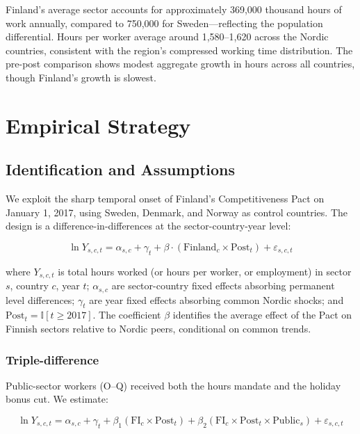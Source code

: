 \documentclass[12pt]{article}
\newcommand{\ind}{\mathbb{I}}
\begin{document}
Finland's average sector accounts for approximately 369,000 thousand hours of work annually, compared to 750,000 for Sweden---reflecting the population differential. Hours per worker average around 1,580--1,620 across the Nordic countries, consistent with the region's compressed working time distribution. The pre-post comparison shows modest aggregate growth in hours across all countries, though Finland's growth is slowest.


\section{Empirical Strategy}

\subsection{Identification and Assumptions}

We exploit the sharp temporal onset of Finland's Competitiveness Pact on January 1, 2017, using Sweden, Denmark, and Norway as control countries. The design is a difference-in-differences at the sector-country-year level:

\begin{equation}
\ln Y_{s,c,t} = \alpha_{s,c} + \gamma_t + \beta \cdot (\text{Finland}_c \times \text{Post}_t) + \varepsilon_{s,c,t}
\label{eq:did}
\end{equation}

where $Y_{s,c,t}$ is total hours worked (or hours per worker, or employment) in sector $s$, country $c$, year $t$; $\alpha_{s,c}$ are sector-country fixed effects absorbing permanent level differences; $\gamma_t$ are year fixed effects absorbing common Nordic shocks; and $\text{Post}_t = \ind[t \geq 2017]$. The coefficient $\beta$ identifies the average effect of the Pact on Finnish sectors relative to Nordic peers, conditional on common trends.

\subsubsection*{Triple-difference} Public-sector workers (O--Q) received both the hours mandate and the holiday bonus cut. We estimate:

\begin{equation}
\ln Y_{s,c,t} = \alpha_{s,c} + \gamma_t + \beta_1 (\text{FI}_c \times \text{Post}_t) + \beta_2 (\text{FI}_c \times \text{Post}_t \times \text{Public}_s) + \varepsilon_{s,c,t}
\label{eq:ddd}
\end{equation}
\end{document}
